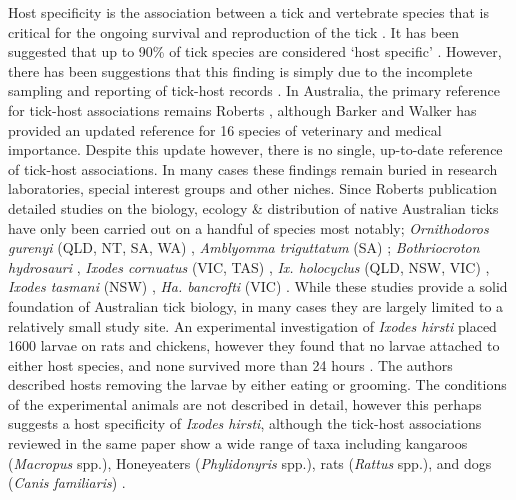 \documentclass[a4paper, nobind]{templates/ociamthesis}
\begin{document}
Host specificity is the association between a tick and vertebrate species that is critical for the ongoing survival and reproduction of the tick \autocite{hoogstraalTickhostSpecificity1982}.
It has been suggested that up to 90\% of tick species are considered `host specific' \autocite{hoogstraalTickhostSpecificity1982}.
However, there has been suggestions that this finding is simply due to the incomplete sampling and reporting of tick-host records \autocite{klompenEvolutionTicks1996}.
In Australia, the primary reference for tick-host associations remains Roberts \autocite*{robertsAustralianTicks1970}, although Barker and Walker \autocite*{barkerTicksAustraliaSpecies2014} has provided an updated reference for 16 species of veterinary and medical importance.
Despite this update however, there is no single, up-to-date reference of tick-host associations.
In many cases these findings remain buried in research laboratories, special interest groups and other niches.
Since Roberts \autocite*{robertsAustralianTicks1970} publication detailed studies on the biology, ecology \& distribution of native Australian ticks have only been carried out on a handful of species most notably; \emph{Ornithodoros gurenyi} (QLD, NT, SA, WA) \autocite{doubeEcologyKangarooTick1972,doubeTwoRacesKangaroo1975}, \emph{Amblyomma triguttatum} (SA) \autocite{waudbySeasonalDensityFluctuations2007}; \emph{Bothriocroton hydrosauri} \autocite{bullDispersalAustralianReptile1978,andrewsMatingBehaviourAustralian1980,belanHostDetectionFour1991,chiltonInterspecificDifferencesMicrohabitat1993}, \emph{Ixodes cornuatus} (VIC, TAS) \autocite{jacksonGeneticVariationTicks2000,jacksonDistributionsParalysisTicks2007,songPhylogeneticPhylogeographicRelationships2011}, \emph{Ix. holocyclus} (QLD, NSW, VIC) \autocite{doubeSeasonalPatternsAbundance1979,jacksonGeneticVariationTicks2000,jacksonDistributionsParalysisTicks2007,songPhylogeneticPhylogeographicRelationships2011}, \emph{Ixodes tasmani} (NSW) \autocite{murdochEcologyCommonMarsupial2005}, \emph{Ha. bancrofti} (VIC) \autocite{laanOccuranceTickHaemaphysalis2011}.
While these studies provide a solid foundation of Australian tick biology, in many cases they are largely limited to a relatively small study site.
An experimental investigation of \emph{Ixodes hirsti} placed 1600 larvae on rats and chickens, however they found that no larvae attached to either host species, and none survived more than 24 hours \autocite{laanObservationsBiologyDistribution2011}.
The authors described hosts removing the larvae by either eating or grooming.
The conditions of the experimental animals are not described in detail, however this perhaps suggests a host specificity of \emph{Ixodes hirsti}, although the tick-host associations reviewed in the same paper show a wide range of taxa including kangaroos (\emph{Macropus} spp.), Honeyeaters (\emph{Phylidonyris} spp.), rats (\emph{Rattus} spp.), and dogs (\emph{Canis familiaris}) \autocite{laanObservationsBiologyDistribution2011}.
\end{document}
